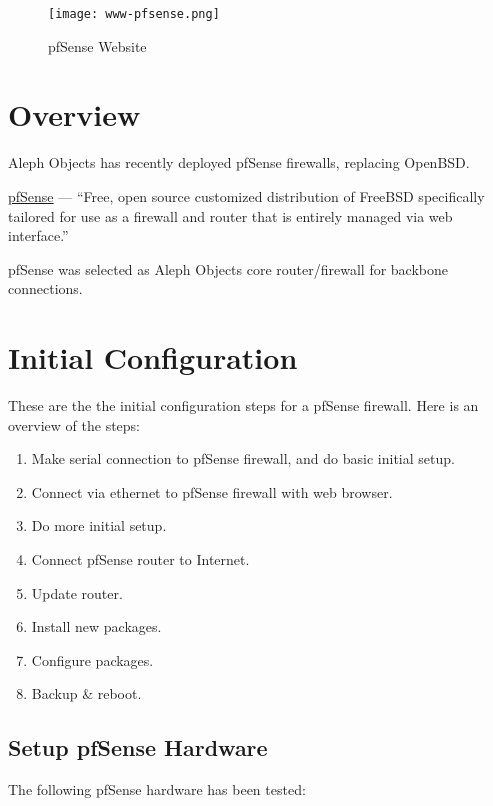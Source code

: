 %
%
%
%
%
\begin{figure}[h!]
\begin{center}
\texttt{[image: www-pfsense.png]}
 \caption{pfSense Website}
 \label{fig:www-pfsense}
\end{center}
\end{figure}

\section{Overview}
Aleph Objects has recently deployed pfSense firewalls, replacing OpenBSD.

\href{https://www.pfsense.org/}{pfSense} --- ``Free, open source customized
distribution of FreeBSD specifically tailored for use as a firewall and router
that is entirely managed via web interface.''

pfSense was selected as Aleph Objects core router/firewall for backbone
connections.

\section{Initial Configuration}

These are the the initial configuration steps for a pfSense firewall. Here is an overview of the steps:

\begin{enumerate}
 \item Make serial connection to pfSense firewall, and do basic initial setup.
 \item Connect via ethernet to pfSense firewall with web browser.
 \item Do more initial setup.
 \item Connect pfSense router to Internet.
 \item Update router.
 \item Install new packages.
 \item Configure packages.
 \item Backup \& reboot.
\end{enumerate}


\subsection{Setup pfSense Hardware}
The following pfSense hardware has been tested:

